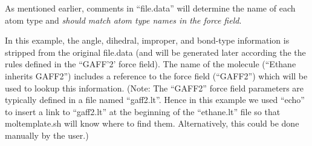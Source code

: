 \documentclass[11pt]{article}
\begin{document}
As mentioned earlier, comments in ``file.data'' will determine the name
of each atom type and \textit{should match atom type names in the force field}.


In this example, the angle, dihedral, improper, and bond-type
information is stripped from the original file.data
(and will be generated later according the the rules
defined in the ``GAFF'2' force field).
The name of the molecule (``Ethane inherits GAFF2'') includes a reference
to the force field (``GAFF2'') which will be used to lookup this information.
(Note: The ``GAFF2'' force field parameters are typically defined in a file
       named ``gaff2.lt''.  Hence in this example we used ``echo''
       to insert a link to ``gaff2.lt'' at the beginning of the
       ``ethane.lt'' file so that moltemplate.sh will know where to find them.
       Alternatively, this could be done manually by the user.)
\end{document}
